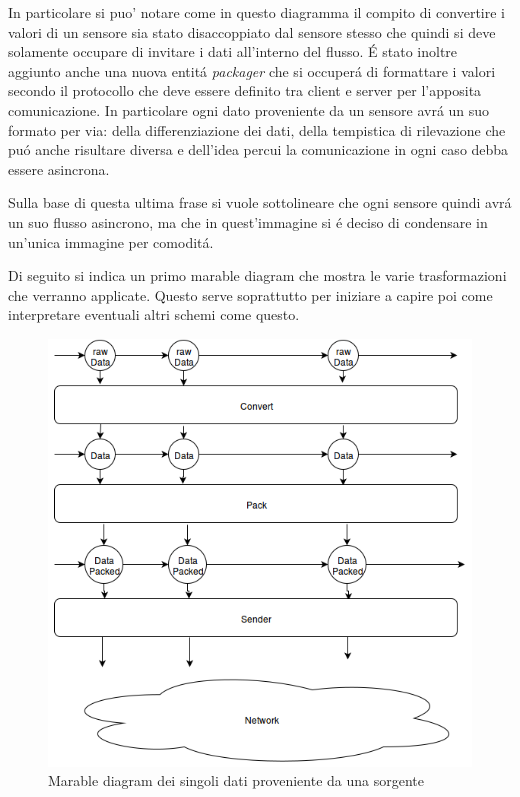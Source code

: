 In particolare si puo' notare come in questo diagramma il compito di convertire i valori di un sensore sia stato disaccoppiato dal sensore stesso che quindi si deve solamente occupare di invitare i dati all'interno del flusso. \'E stato inoltre aggiunto anche una nuova entit\'a \textit{packager} che si occuper\'a di formattare i valori secondo il protocollo che deve essere definito tra client e server per l'apposita comunicazione. In particolare ogni dato proveniente da un sensore avr\'a un suo formato per via: della differenziazione dei dati, della tempistica di rilevazione che pu\'o anche risultare diversa e dell'idea percui la comunicazione in ogni caso debba essere asincrona.

Sulla base di questa ultima frase si vuole sottolineare che ogni sensore quindi avr\'a un suo flusso asincrono, ma che in quest'immagine si \'e deciso di condensare in un'unica immagine per comodit\'a.

Di seguito si indica un primo marable diagram che mostra le varie trasformazioni che verranno applicate. Questo serve soprattutto per iniziare a capire poi come interpretare eventuali altri schemi come questo.

\begin{figure}[ht]
\centering
\includegraphics[scale=0.7]{Figures/LogicArchitecture/EmbeddedSystem/MarableDiagram}
\caption{Marable diagram dei singoli dati proveniente da una sorgente}
\end{figure}


